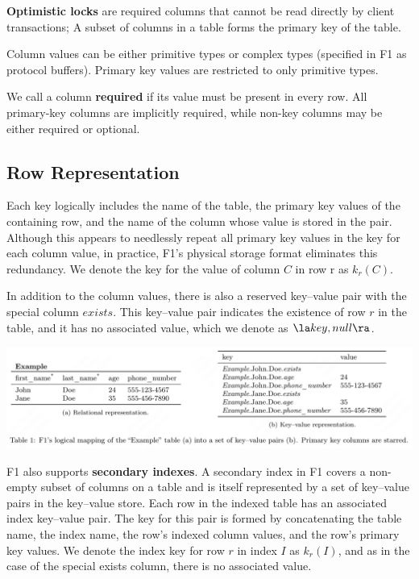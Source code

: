 \documentclass[11pt]{article}
\begin{document}
\textbf{Optimistic locks} are required columns that cannot be read directly by client transactions; A subset of
columns in a table forms the primary key of the table.

Column values can be either primitive types or complex types (specified in F1 as protocol buffers).
Primary key values are restricted to only primitive types.

We call a column \textbf{required} if its value must be present in every row. All primary-key columns are
implicitly required, while non-key columns may be either required or optional.
\subsection{Row Representation}
\label{sec:orge034392}
Each key logically includes the name of the table, the primary key values of the containing row, and
the name of the column whose value is stored in the pair. Although this appears to needlessly repeat
all primary key values in the key for each column value, in practice, F1’s physical storage format
eliminates this redundancy. We denote the key for the value of column \(C\) in row r as \(k_r(C)\).

In addition to the column values, there is also a reserved key–value pair with the special column
\(exists\). This key–value pair indicates the existence of row \(r\) in the table, and it has no
associated value, which we denote as \(\la key,null\ra\).

\begin{center}
\includegraphics[width=.99\textwidth]{../../images/papers/28.png}
\label{}
\end{center}

F1 also supports \textbf{secondary indexes}. A secondary index in F1 covers a non-empty subset of columns on a
table and is itself represented by a set of key–value pairs in the key–value store. Each row in the
indexed table has an associated index key–value pair. The key for this pair is formed by concatenating
the table name, the index name, the row’s indexed column values, and the row’s primary key values. We
denote the index key for row \(r\) in index \(I\) as \(k_r(I)\), and as in the case of the special
exists column, there is no associated value.
\end{document}
